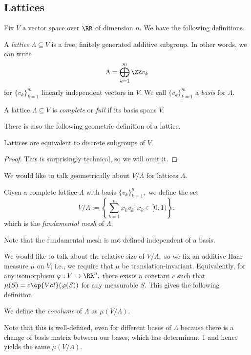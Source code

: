 















\subsection{Lattices}
Fix $V$ a vector space over $\RR$ of dimension $n.$ We have the following definitions.
\begin{definition}[Lattice]
    A \textit{lattice} $\Lambda\subseteq V$ is a free, finitely generated additive subgroup. In other words, we can write
    \[\Lambda=\bigoplus_{k=1}^m\ZZ v_k\]
    for $\{v_k\}_{k=1}^m$ linearly independent vectors in $V.$ We call $\{v_k\}_{k=1}^m$ a \textit{basis} for $\Lambda.$
\end{definition}
\begin{definition}[Complete]
    A lattice $\Lambda\subseteq V$ is \textit{complete} or \textit{full} if its basis spans $V.$
\end{definition}
There is also the following geometric definition of a lattice.
\begin{proposition}
    Lattices are equivalent to discrete subgroups of $V.$
\end{proposition}
\begin{proof}
    This is surprisingly technical, so we will omit it.
\end{proof}
We would like to talk geometrically about $V/\Lambda$ for lattices $\Lambda.$
\begin{definition}
    Given a complete lattice $\Lambda$ with basis $\{v_k\}_{k=1}^n,$ we define the set
    \[V/\Lambda:=\left\{\sum_{k=1}^n x_k v_k:x_k\in[0,1)\right\},\]
    which is the \textit{fundamental mesh} of $\Lambda.$
\end{definition}
Note that the fundamental mesh is not defined independent of a basis.

We would like to talk about the relative size of $V/\Lambda,$ so we fix an additive Haar measure $\mu$ on $V$; i.e., we require that $\mu$ be translation-invariant. Equivalently, for any isomorphism $\varphi:V\to\RR^n,$ there exists a constant $c$ such that $\mu(S)=c\op{Vol}(\varphi(S))$ for any measurable $S.$ This gives the following definition.
\begin{definition}[Covolume]
    We define the \textit{covolume} of $\Lambda$ as $\mu(V/\Lambda).$
\end{definition}
Note that this is well-defined, even for different bases of $\Lambda$ because there is a change of basis matrix between our bases, which has determinant $1$ and hence yields the same $\mu(V/\Lambda).$

